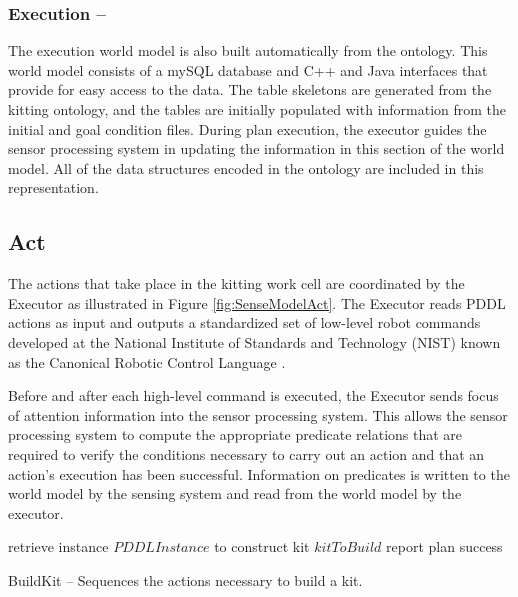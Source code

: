 \subsubsection{Execution --}
The execution world model is also built automatically from the ontology. This world model consists of a mySQL database and C++ and Java
interfaces that provide for easy access to the data. The table skeletons are generated from the kitting ontology, and the tables are initially populated
with information from the initial and goal condition files. During plan execution, the executor guides the sensor processing system
in updating the information in 
this section of the world model. All of the data structures encoded in the ontology are included in this representation. 
%
\subsection{Act}
\label{subsection:Act}
The actions that take place in the kitting work cell are coordinated by the Executor as illustrated in Figure \ref{fig:SenseModelAct}.  The Executor
reads PDDL actions as input and outputs a standardized set of low-level robot commands developed at the National Institute of Standards
and Technology (NIST) known as the  Canonical Robotic Control Language \cite{Balakirsky2012-1}. 

Before and after each high-level command
is executed, the Executor sends focus of attention information into the sensor processing system. This allows the sensor processing system to compute
the appropriate predicate relations that are required to verify the conditions necessary to carry out an action and that an action's execution has
been successful. Information on predicates is written to the world model by the sensing system and read from the world model by the executor.
%
\\
\begin{algorithm}[h!]

 	retrieve instance $PDDLInstance$ to construct kit $kitToBuild$\;
 	report plan success\;
\caption{{\sc BuildKit} -- Sequences the actions necessary to build a kit.}
\label{fig:buildkit}
\end{algorithm}
%